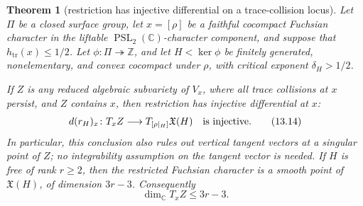 \documentclass[11pt,reqno]{amsart}
\newtheorem{theorem}{Theorem}[section]
\theoremstyle{definition}
\theoremstyle{remark}
\newcommand{\C}{\mathbb C}
\newcommand{\Z}{\mathbb Z}
\newcommand{\Tr}{\operatorname{tr}}
\newcommand{\PSL}{\operatorname{PSL}}
\begin{document}
\begin{theorem}[restriction has injective differential on a trace-collision locus]
\label{thm:restriction-unramified}
Let \(\Pi\) be a closed surface group, let
\(x=[\rho]\) be a faithful cocompact Fuchsian character in the liftable
\(\PSL_2(\C)\)-character component, and suppose that
\(h_{\Tr}(x)\le 1/2\).  Let
\(\phi\colon\Pi\twoheadrightarrow\Z\), and let
\(H<\ker\phi\) be finitely generated, nonelementary, and convex cocompact
under \(\rho\), with critical exponent \(\delta_H>1/2\).

If \(Z\) is any reduced algebraic subvariety of \(V_x\), where all trace
collisions at \(x\) persist, and \(Z\) contains \(x\), then restriction
has injective differential at \(x\):
\[
 d(r_H)_x\colon T_xZ\longrightarrow
 T_{[\rho|_H]}\mathfrak X(H)
 \quad\hbox{is injective}.
\tag{13.14}
\]
In particular, this conclusion also rules out vertical tangent vectors at a
singular point of \(Z\); no integrability assumption on the tangent vector
is needed.  If \(H\) is free of rank \(r\ge2\), then the restricted
Fuchsian character is a smooth point of \(\mathfrak X(H)\), of dimension
\(3r-3\).  Consequently
\[
 \dim_{\C}T_xZ\le 3r-3.
\]
\end{theorem}
\end{document}
